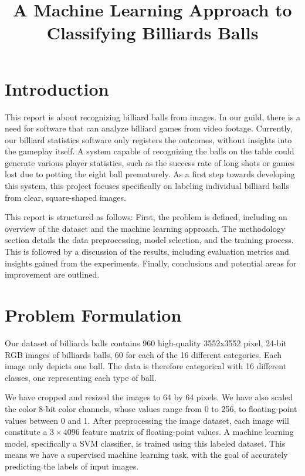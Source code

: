 \documentclass{article}
\begin{document}

\title{A Machine Learning Approach to Classifying Billiards Balls}
\maketitle

\section{Introduction}
\label{sec:introduction}
This report is about recognizing billiard balls from images. In our guild, there is a need for software that can analyze billiard games from video footage. Currently, our billiard statistics software only registers the outcomes, without insights into the gameplay itself. A system capable of recognizing the balls on the table could generate various player statistics, such as the success rate of long shots or games lost due to potting the eight ball prematurely. As a first step towards developing this system, this project focuses specifically on labeling individual billiard balls from clear, square-shaped images.

This report is structured as follows: First, the problem is defined, including an overview of the dataset and the machine learning approach. The methodology section details the data preprocessing, model selection, and the training process. This is followed by a discussion of the results, including evaluation metrics and insights gained from the experiments. Finally, conclusions and potential areas for improvement are outlined.


\section{Problem Formulation}
\label{sec:problem_formulation}
Our dataset of billiards balls contains 960 high-quality 3552x3552 pixel, 24-bit RGB images of billiards balls, 60 for each of the 16 different categories. 
Each image only depicts one ball. The data is therefore categorical with 16 different classes, one representing each type of ball.


We have cropped and resized the images to 64 by 64 pixels. We have also scaled the color 8-bit color channels, whose values range from 0 to 256, 
to floating-point values between 0 and 1. After preprocessing the image dataset, each image will constitute a $3\times 4096$ feature matrix of floating-point values. 
A machine learning model, specifically a SVM classifier, is trained using this labeled dataset. This means we have a supervised machine learning task, with the goal of accurately 
predicting the labels of input images. 
\end{document}
